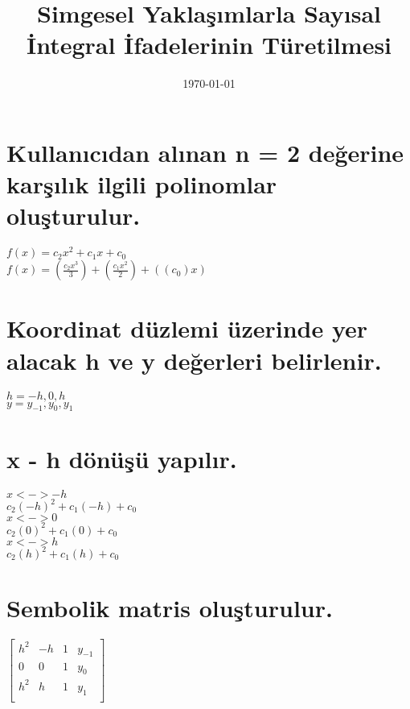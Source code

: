 \documentclass{article}
\begin{document}
\title{Simgesel Yaklaşımlarla Sayısal İntegral İfadelerinin Türetilmesi}
\date{\today}
\maketitle

\section{Kullanıcıdan alınan n = 2 değerine karşılık ilgili polinomlar oluşturulur.}
$f(x) = c_{2}x^2 + c_{1}x + c_{0}$\\
$f(x) = (\frac{c_{2}x^3}{3}) + (\frac{c_{1}x^2}{2}) + ((c_{0})x)$

\section{Koordinat düzlemi üzerinde yer alacak h ve y değerleri belirlenir.}
$h = -h,0,h$\\
$y = y_{-1},y_{0},y_{1}$

\section{x - h dönüşü yapılır.}
$x< - >-h$\\
$c_{2}(-h)^2 + c_{1}(-h) + c_{0}$\\
$x< - >0$\\
$c_{2}(0)^2 + c_{1}(0) + c_{0}$\\
$x< - >h$\\
$c_{2}(h)^2 + c_{1}(h) + c_{0}$


\section{Sembolik matris oluşturulur.}

\begin{center}

$\begin{bmatrix}

h^2&-h&1&y_{-1}\\
0&0&1&y_{0}\\
h^2&h&1&y_{1}\\


\end{bmatrix} $ 

\end{center}
\end{document}
